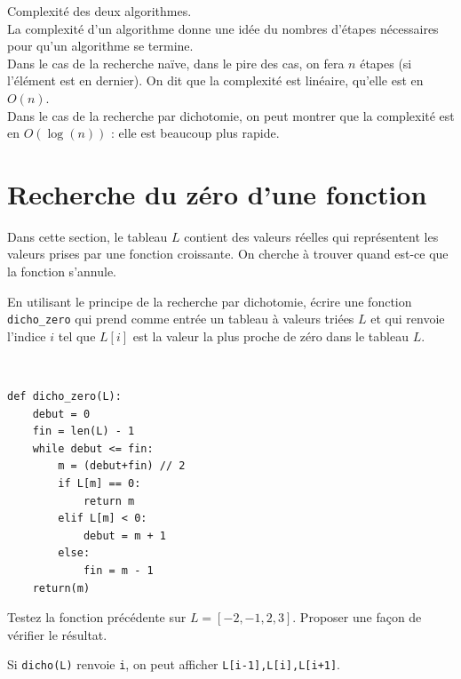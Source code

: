 \begin{remark}Complexité des deux algorithmes.\\
La complexité d'un algorithme donne une idée du nombres d'étapes nécessaires pour qu'un algorithme se termine.\\
Dans le cas de la recherche naïve, dans le pire des cas, on fera $n$ étapes (si l'élément est en dernier). On dit que la complexité est linéaire, qu'elle est en $O(n)$.\\
Dans le cas de la recherche par dichotomie, on peut montrer que la complexité est en $O(\log(n))$ : elle est beaucoup plus rapide.
\end{remark}



\section{Recherche du zéro d'une fonction}

Dans cette section, le tableau $L$ contient des valeurs réelles qui représentent les valeurs prises par une fonction croissante. On cherche à trouver quand est-ce que la fonction s'annule.

\begin{exercice}
En utilisant le principe de la recherche par dichotomie, écrire une fonction \verb?dicho_zero? qui prend comme entrée un tableau à valeurs triées $L$ et qui renvoie l'indice $i$ tel que $L[i]$ est la valeur la plus proche de zéro dans le tableau $L$.
\end{exercice}

\begin{solution}~\\
\vspace{-0.7cm}
\begin{verbatim}
def dicho_zero(L):
    debut = 0
    fin = len(L) - 1
    while debut <= fin:
        m = (debut+fin) // 2
        if L[m] == 0:
            return m
        elif L[m] < 0:
            debut = m + 1
        else:
            fin = m - 1
    return(m)
\end{verbatim}    
\end{solution}

\begin{exercice}
Testez la fonction précédente sur $L=[-2,-1,2,3]$. Proposer une fa\c con de vérifier le résultat.
\end{exercice}

\begin{solution}
Si \verb?dicho(L)? renvoie \verb?i?, on peut afficher \verb?L[i-1],L[i],L[i+1]?.
\end{solution}

